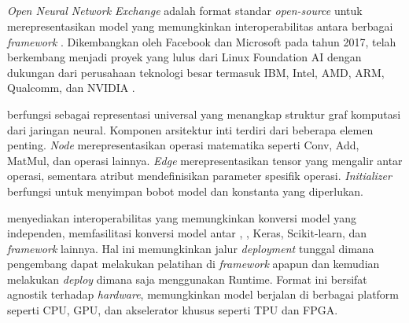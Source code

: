 \subsection{\onnx}
\label{subsec:onnx}

\emph{Open Neural Network Exchange} \onnx{} adalah format standar \emph{open-source} untuk merepresentasikan model \ml{} yang memungkinkan interoperabilitas antara berbagai \emph{framework} \dl. Dikembangkan oleh Facebook dan Microsoft pada tahun 2017, \onnx{} telah berkembang menjadi proyek yang lulus dari Linux Foundation AI dengan dukungan dari perusahaan teknologi besar termasuk IBM, Intel, AMD, ARM, Qualcomm, dan NVIDIA \parencite{onnxgithub2019}.

\onnx{} berfungsi sebagai representasi universal yang menangkap struktur graf komputasi dari jaringan neural. Komponen arsitektur inti \onnx{} terdiri dari beberapa elemen penting. \emph{Node} merepresentasikan operasi matematika seperti Conv, Add, MatMul, dan operasi lainnya. \emph{Edge} merepresentasikan tensor yang mengalir antar operasi, sementara atribut mendefinisikan parameter spesifik operasi. \emph{Initializer} berfungsi untuk menyimpan bobot model dan konstanta yang diperlukan.



\onnx{} menyediakan interoperabilitas yang memungkinkan konversi model yang independen, memfasilitasi konversi model antar \pytorch, \tensorflow, Keras, Scikit-learn, dan \emph{framework} lainnya. Hal ini memungkinkan jalur \emph{deployment} tunggal dimana pengembang dapat melakukan pelatihan di \emph{framework} apapun dan kemudian melakukan \emph{deploy} dimana saja menggunakan \onnx Runtime. Format ini bersifat agnostik terhadap \emph{hardware}, memungkinkan model berjalan di berbagai platform seperti CPU, GPU, dan akselerator khusus seperti TPU dan FPGA.

